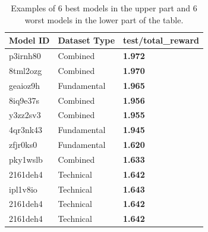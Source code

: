 \documentclass[../xlapes02]{subfiles}
\begin{document}
    \begin{table}[H]
        \centering
        \begin{tabular}{|l|l|l|}
            \hline
            \textbf{Model ID} & \textbf{Dataset Type} & \textbf{test/total\_reward}                \\ \hline
            p3irnh80          & Combined              & \textcolor[RGB]{50,150,50}{\textbf{1.972}} \\ \hline
            8tml2ozg          & Combined              & \textcolor[RGB]{50,150,50}{\textbf{1.970}} \\ \hline
            geaioz9h          & Fundamental           & \textcolor[RGB]{50,150,50}{\textbf{1.965}} \\ \hline
            8iq9e37s          & Combined              & \textcolor[RGB]{50,150,50}{\textbf{1.956}} \\ \hline
            y3zz2sv3          & Combined              & \textcolor[RGB]{50,150,50}{\textbf{1.955}} \\ \hline
            4qr3nk43          & Fundamental           & \textcolor[RGB]{50,150,50}{\textbf{1.945}} \\
            \midrule
            \midrule
            zfjr0ks0          & Fundamental           & \textcolor[RGB]{150,50,50}{\textbf{1.620}} \\ \hline
            pky1wslb          & Combined              & \textcolor[RGB]{150,50,50}{\textbf{1.633}} \\ \hline
            2161deh4          & Technical             & \textcolor[RGB]{150,50,50}{\textbf{1.642}} \\ \hline
            ipl1v8io          & Technical             & \textcolor[RGB]{150,50,50}{\textbf{1.643}} \\ \hline
            2161deh4          & Technical             & \textcolor[RGB]{150,50,50}{\textbf{1.642}} \\ \hline
            2161deh4          & Technical             & \textcolor[RGB]{150,50,50}{\textbf{1.642}} \\ \hline
        \end{tabular}
        \caption{Examples of 6 best models in the upper part and 6 worst models in the lower part of the table.}
        \label{tab:datasets-comparison}
    \end{table}
\end{document}
